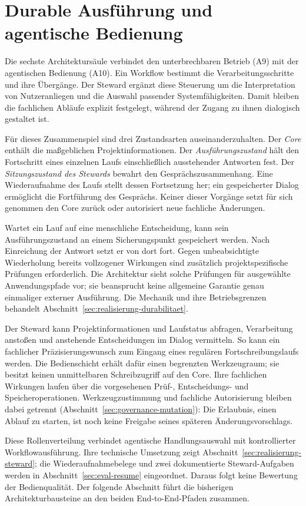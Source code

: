 
\section{Durable Ausführung und agentische Bedienung}
\label{sec:durable-ausfuehrung-agentische-bedienung}

Die sechste Architektursäule verbindet den unterbrechbaren Betrieb
(A9) mit der agentischen Bedienung (A10). Ein Workflow bestimmt die
Verarbeitungsschritte und ihre Übergänge. Der Steward ergänzt diese
Steuerung um die Interpretation von Nutzeranliegen und die Auswahl
passender Systemfähigkeiten. Damit bleiben die fachlichen Abläufe
explizit festgelegt, während der Zugang zu ihnen dialogisch gestaltet
ist.

Für dieses Zusammenspiel sind drei Zustandsarten auseinanderzuhalten.
Der \emph{Core} enthält die maßgeblichen Projektinformationen. Der
\emph{Ausführungszustand} hält den Fortschritt eines einzelnen Laufs
einschließlich ausstehender Antworten fest. Der
\emph{Sitzungszustand des Stewards} bewahrt den Gesprächszusammenhang.
Eine Wiederaufnahme des Laufs stellt dessen Fortsetzung her; ein
gespeicherter Dialog ermöglicht die Fortführung des Gesprächs. Keiner
dieser Vorgänge setzt für sich genommen den Core zurück oder autorisiert
neue fachliche Änderungen.

Wartet ein Lauf auf eine menschliche Entscheidung, kann sein
Ausführungszustand an einem Sicherungspunkt gespeichert werden. Nach
Einreichung der Antwort setzt er von dort fort. Gegen unbeabsichtigte
Wiederholung bereits vollzogener Wirkungen sind zusätzlich
projektspezifische Prüfungen erforderlich. Die Architektur sieht solche
Prüfungen für ausgewählte Anwendungspfade vor; sie beansprucht keine
allgemeine Garantie genau einmaliger externer Ausführung. Die Mechanik
und ihre Betriebsgrenzen behandelt
Abschnitt~\ref{sec:realisierung-durabilitaet}.

Der Steward kann Projektinformationen und Laufstatus abfragen,
Verarbeitung anstoßen und anstehende Entscheidungen im Dialog
vermitteln. So kann ein fachlicher Präzisierungswunsch zum Eingang
eines regulären Fortschreibungslaufs werden. Die Bedienschicht erhält
dafür einen begrenzten Werkzeugraum; sie besitzt keinen unmittelbaren
Schreibzugriff auf den Core. Ihre fachlichen Wirkungen laufen über
die vorgesehenen Prüf-, Entscheidungs- und Speicheroperationen.
Werkzeugzustimmung und fachliche Autorisierung bleiben dabei getrennt
(Abschnitt~\ref{sec:governance-mutation}): Die Erlaubnis, einen Ablauf
zu starten, ist noch keine Freigabe seines späteren Änderungsvorschlags.

Diese Rollenverteilung verbindet agentische Handlungsauswahl mit
kontrollierter Workflowausführung. Ihre technische Umsetzung zeigt
Abschnitt~\ref{sec:realisierung-steward}; die Wiederaufnahmebelege und
zwei dokumentierte Steward-Aufgaben werden in
Abschnitt~\ref{sec:eval-resume} eingeordnet. Daraus folgt keine
Bewertung der Bedienqualität. Der folgende Abschnitt führt die
bisherigen Architekturbausteine an den beiden End-to-End-Pfaden
zusammen.
